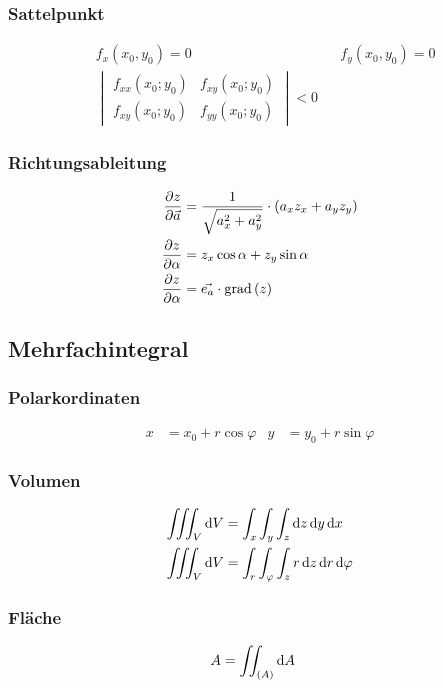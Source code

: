 \subsubsection*{Sattelpunkt}
\begin{align*}
&f_x(x_0,y_0)=0&&f_y(x_0,y_0)=0\\
&\begin{vmatrix}f_{xx}(x_0;y_0)&f_{xy}(x_0;y_0)\\f_{xy}(x_0;y_0)&f_{yy}(x_0;y_0)\end{vmatrix}<0
\end{align*}

\subsubsection*{Richtungsableitung}
\begin{align*}
\frac{\partial z}{\partial \vec{a}}&=\frac{1}{\sqrt{a_x^2+a_y^2}}\cdot\left(a_xz_x+a_yz_y\right)\\
\frac{\partial z}{\partial \alpha}&=z_x\cos\alpha+z_y\sin\alpha\\
\frac{\partial z}{\partial \alpha}&=\vec{e_a}\cdot \mathop{}\!\mathrm{grad}\left(z\right)
\end{align*}

\subsection{Mehrfachintegral}
\subsubsection*{Polarkordinaten}
\begin{align*}
x&=x_0+r\cos\varphi&y&=y_0+r\sin\varphi
\end{align*}

\begin{multicols}{2}
\subsubsection*{Volumen}
\begin{align*}
\iiint_{V}\diff V&=\int_x\int_y\int_z \diff z\diff y\diff x\\
\iiint_{V}\diff V&=\int_r\int_\varphi\int_z r\diff z\diff r \diff \varphi\\
\end{align*}

\subsubsection*{Fläche}
\begin{align*}
A&=\iint_{(A)}\mathop{}\!\mathrm{d} A
\end{align*} 
\vfill
\end{multicols}

